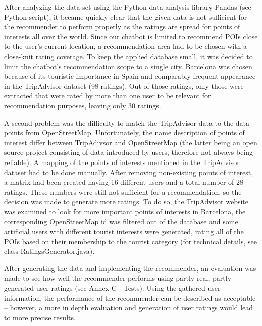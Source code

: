 After analyzing the data set using the Python data analysis library Pandas (see Python script), it became quickly clear that the given data is not sufficient for the recommender to perform properly as the ratings are spread for points of interests all over the world. Since our chatbot is limited to recommend POIs close to the user’s current location, a recommendation area had to be chosen with a close-knit rating coverage. To keep the applied database small, it was decided to limit the chatbot’s recommendation scope to a single city. Barcelona was chosen because of its touristic importance in Spain and comparably frequent appearance in the TripAdvisor dataset (98 ratings). Out of those ratings, only those were extracted that were rated by more than one user to be relevant for recommendation purposes, leaving only 30 ratings.

A second problem was the difficulty to match the TripAdvisor data to the data points from OpenStreetMap. Unfortunately, the name description of points of interest differ between TripAdivsor and OpenStreetMap (the latter being an open source project consisting of data introduced by users, therefore not always being reliable). A mapping of the points of interests mentioned in the TripAdvisor dataset had to be done manually. After removing non-existing points of interest, a matrix had been created having 16 different users and a total number of 28 ratings. These numbers were still not sufficient for a recommendation, so the decision was made to generate more ratings.  To do so, the TripAdvisor website was examined to look for more important points of interests in Barcelona, the corresponding OpenStreetMap id was filtered out of the database and some artificial users with different tourist interests were generated, rating all of the POIs based on their membership to the tourist category (for technical details, see class RatingsGenerator.java).

After generating the data and implementing the recommender, an evaluation was made to see how well the recommender performs using partly real, partly generated user ratings (see Annex C - Tests). Using the gathered user information, the performance of the recommender can be described as acceptable – however, a more in depth evaluation and generation of user ratings would lead to more precise results.

